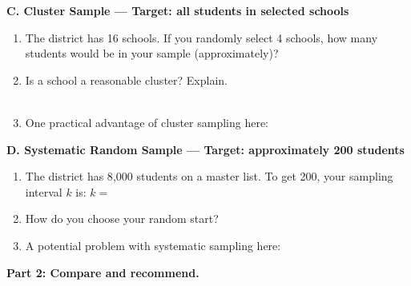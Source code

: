 \documentclass[10pt]{article}
\begin{document}
\vspace{0.1in}

\begin{practicebox}
\small
\textbf{C. Cluster Sample --- Target: all students in selected schools}

\begin{enumerate}[leftmargin=1.5em, itemsep=6pt]
  \item The district has 16 schools. If you randomly select 4 schools, how many
        students would be in your sample (approximately)? 
  \item Is a school a reasonable cluster? Explain.\\
        \\[1pt]
  \item One practical advantage of cluster sampling here: 
\end{enumerate}
\end{practicebox}

\vspace{0.1in}

\begin{practicebox}
\small
\textbf{D. Systematic Random Sample --- Target: approximately 200 students}

\begin{enumerate}[leftmargin=1.5em, itemsep=6pt]
  \item The district has 8{,}000 students on a master list. To get 200, your sampling
        interval $k$ is: $k = $ 
  \item How do you choose your random start? 
  \item A potential problem with systematic sampling here: 
\end{enumerate}
\end{practicebox}

\vspace{0.1in}

\textbf{Part 2: Compare and recommend.}
\end{document}
